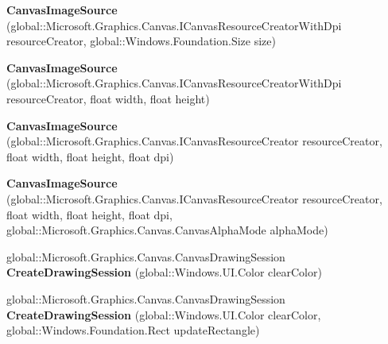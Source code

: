 \begin{DoxyCompactItemize}
{\bfseries Canvas\+Image\+Source} (global\+::\+Microsoft.\+Graphics.\+Canvas.\+I\+Canvas\+Resource\+Creator\+With\+Dpi resource\+Creator, global\+::\+Windows.\+Foundation.\+Size size)
\item 
\mbox{\label{class_microsoft_1_1_graphics_1_1_canvas_1_1_u_i_1_1_xaml_1_1_canvas_image_source_a59470b76c2a432e8d723603569f5e5bf}} 
{\bfseries Canvas\+Image\+Source} (global\+::\+Microsoft.\+Graphics.\+Canvas.\+I\+Canvas\+Resource\+Creator\+With\+Dpi resource\+Creator, float width, float height)
\item 
\mbox{\label{class_microsoft_1_1_graphics_1_1_canvas_1_1_u_i_1_1_xaml_1_1_canvas_image_source_a879541668a8b03ad33dddb352363a22b}} 
{\bfseries Canvas\+Image\+Source} (global\+::\+Microsoft.\+Graphics.\+Canvas.\+I\+Canvas\+Resource\+Creator resource\+Creator, float width, float height, float dpi)
\item 
\mbox{\label{class_microsoft_1_1_graphics_1_1_canvas_1_1_u_i_1_1_xaml_1_1_canvas_image_source_af7653cd38e9fa993c395e9aab7f32134}} 
{\bfseries Canvas\+Image\+Source} (global\+::\+Microsoft.\+Graphics.\+Canvas.\+I\+Canvas\+Resource\+Creator resource\+Creator, float width, float height, float dpi, global\+::\+Microsoft.\+Graphics.\+Canvas.\+Canvas\+Alpha\+Mode alpha\+Mode)
\item 
\mbox{\label{class_microsoft_1_1_graphics_1_1_canvas_1_1_u_i_1_1_xaml_1_1_canvas_image_source_a4252f5557def050fbeabcb6a457d4ec6}} 
global\+::\+Microsoft.\+Graphics.\+Canvas.\+Canvas\+Drawing\+Session {\bfseries Create\+Drawing\+Session} (global\+::\+Windows.\+U\+I.\+Color clear\+Color)
\item 
\mbox{\label{class_microsoft_1_1_graphics_1_1_canvas_1_1_u_i_1_1_xaml_1_1_canvas_image_source_ad904cc5b67ec7ea96ba67d9e7f9a7392}} 
global\+::\+Microsoft.\+Graphics.\+Canvas.\+Canvas\+Drawing\+Session {\bfseries Create\+Drawing\+Session} (global\+::\+Windows.\+U\+I.\+Color clear\+Color, global\+::\+Windows.\+Foundation.\+Rect update\+Rectangle)

\end{DoxyCompactItemize}
